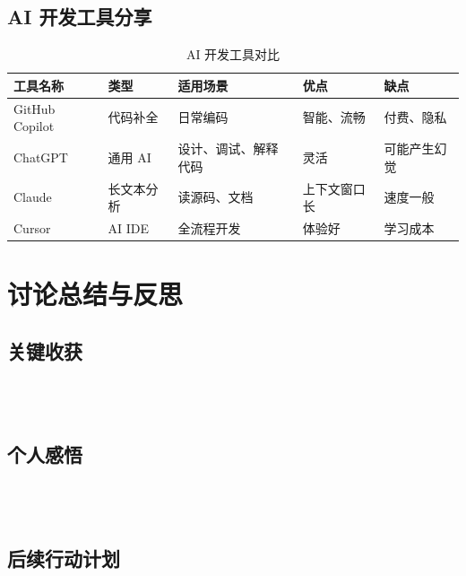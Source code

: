 \documentclass[12pt,a4paper]{article}
\begin{document}
\subsection{AI 开发工具分享}

\begin{table}[htbp]
\centering
\caption{AI 开发工具对比}
\label{tab:tools}
\renewcommand{\arraystretch}{1.3}
\begin{tabularx}{\textwidth}{|>{\centering\arraybackslash}m{2.2cm}|>{\centering\arraybackslash}m{1.8cm}|>{\centering\arraybackslash}m{2.8cm}|>{\centering\arraybackslash}m{3cm}|>{\centering\arraybackslash}m{3cm}|}
\hline
\textbf{工具名称} & \textbf{类型} & \textbf{适用场景} & \textbf{优点} & \textbf{缺点} \\
\hline
GitHub Copilot & 代码补全 & 日常编码 & 智能、流畅 & 付费、隐私 \\
\hline
ChatGPT & 通用 AI & 设计、调试、解释代码 & 灵活 & 可能产生幻觉 \\
\hline
Claude & 长文本分析 & 读源码、文档 & 上下文窗口长 & 速度一般 \\
\hline
Cursor & AI IDE & 全流程开发 & 体验好 & 学习成本 \\
\hline
\hline
\end{tabularx}
\end{table}

\section{讨论总结与反思}

\subsection{关键收获}
\vspace{0.5cm}
\noindent\makebox[\textwidth]{}\\
\noindent\makebox[\textwidth]{}\\
\noindent\makebox[\textwidth]{}

\subsection{个人感悟}
\vspace{0.5cm}
\noindent\makebox[\textwidth]{}\\
\noindent\makebox[\textwidth]{}\\
\noindent\makebox[\textwidth]{}

\subsection{后续行动计划}
\vspace{0.5cm}
\noindent\makebox[\textwidth]{}\\
\noindent\makebox[\textwidth]{}\\
\noindent\makebox[\textwidth]{}
\end{document}
